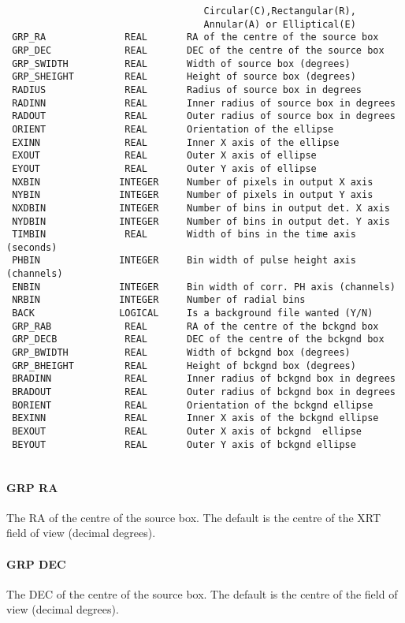 \documentclass{book}
\renewcommand{\_}{{\tt\char'137}}     %
\begin{document}
\begin{verbatim}
                                   Circular(C),Rectangular(R),
                                   Annular(A) or Elliptical(E)
 GRP_RA              REAL       RA of the centre of the source box
 GRP_DEC             REAL       DEC of the centre of the source box
 GRP_SWIDTH          REAL       Width of source box (degrees)
 GRP_SHEIGHT         REAL       Height of source box (degrees)
 RADIUS              REAL       Radius of source box in degrees
 RADINN              REAL       Inner radius of source box in degrees
 RADOUT              REAL       Outer radius of source box in degrees
 ORIENT              REAL       Orientation of the ellipse
 EXINN               REAL       Inner X axis of the ellipse
 EXOUT               REAL       Outer X axis of ellipse
 EYOUT               REAL       Outer Y axis of ellipse
 NXBIN              INTEGER     Number of pixels in output X axis
 NYBIN              INTEGER     Number of pixels in output Y axis
 NXDBIN             INTEGER     Number of bins in output det. X axis
 NYDBIN             INTEGER     Number of bins in output det. Y axis
 TIMBIN              REAL       Width of bins in the time axis (seconds)
 PHBIN              INTEGER     Bin width of pulse height axis (channels)
 ENBIN              INTEGER     Bin width of corr. PH axis (channels)
 NRBIN              INTEGER     Number of radial bins
 BACK               LOGICAL     Is a background file wanted (Y/N)
 GRP_RAB             REAL       RA of the centre of the bckgnd box
 GRP_DECB            REAL       DEC of the centre of the bckgnd box
 GRP_BWIDTH          REAL       Width of bckgnd box (degrees)
 GRP_BHEIGHT         REAL       Height of bckgnd box (degrees)
 BRADINN             REAL       Inner radius of bckgnd box in degrees
 BRADOUT             REAL       Outer radius of bckgnd box in degrees
 BORIENT             REAL       Orientation of the bckgnd ellipse
 BEXINN              REAL       Inner X axis of the bckgnd ellipse
 BEXOUT              REAL       Outer X axis of bckgnd  ellipse
 BEYOUT              REAL       Outer Y axis of bckgnd ellipse
 
\end{verbatim}\paragraph{GRP RA}
The RA of the centre of the source box. The default is the centre
of the XRT field of view (decimal degrees).
 
\paragraph{GRP DEC}
The DEC of the centre of the source box. The default is the centre
of the field of view (decimal degrees).
 
\end{document}
